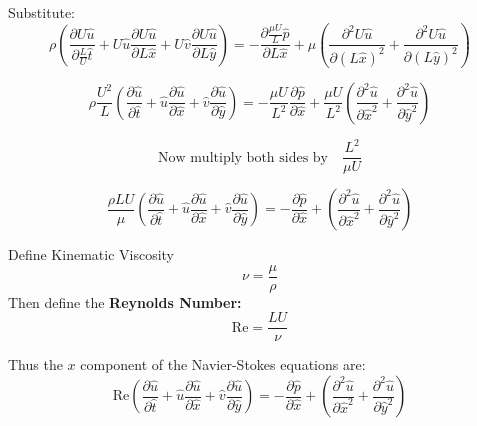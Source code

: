 \documentclass[a4paper]{report}
\begin{document}
Substitute:
\begin{equation}
\rho \left( \frac{\partial U\hat{u}}{\partial \frac{L}{U}\hat{t}} +
U\hat{u} \frac{\partial U\hat{u}}{\partial L\hat{x}} +
U\hat{v} \frac{\partial U\hat{u}}{\partial L\hat{y}} \right) =
 - \frac{\partial \frac{\mu U}{L} \hat{p}}{\partial L\hat{x}} + 
\mu \left( \frac{\partial^2 U\hat{u}}{\partial (L\hat{x})^2} + 
\frac{\partial^2 U\hat{u}}{\partial (L\hat{y})^2} \right)
\end{equation}

\begin{equation}
\rho \frac{U^2}{L} \left( \frac{\partial \hat{u}}{\partial \hat{t}} +
\hat{u} \frac{\partial \hat{u}}{\partial \hat{x}} +
\hat{v} \frac{\partial \hat{u}}{\partial \hat{y}} \right) =
 - \frac{\mu U}{L^2} \frac{\partial \hat{p}}{\partial \hat{x}} + 
\frac{\mu U}{L^2} \left( \frac{\partial^2 \hat{u}}{\partial \hat{x}^2} + 
\frac{\partial^2 \hat{u}}{\partial \hat{y}^2} \right)
\end{equation}

\begin{equation}
\text{Now multiply both sides by} \quad \frac{L^2}{\mu U}
\end{equation}

\begin{equation}
\frac{\rho L U}{\mu} \left( \frac{\partial \hat{u}}{\partial \hat{t}} +
\hat{u} \frac{\partial \hat{u}}{\partial \hat{x}} +
\hat{v} \frac{\partial \hat{u}}{\partial \hat{y}} \right) =
 -  \frac{\partial \hat{p}}{\partial \hat{x}} + 
\left( \frac{\partial^2 \hat{u}}{\partial \hat{x}^2} + 
\frac{\partial^2 \hat{u}}{\partial \hat{y}^2} \right)
\end{equation}


\vspace{1em}
Define Kinematic Viscosity
\begin{equation}
\nu = \frac{\mu}{\rho}
\end{equation}
Then define the \textbf{Reynolds Number:}
\begin{equation}
\mathrm{Re} = \frac{L U}{\nu}
\end{equation}

Thus the $x$ component of the Navier-Stokes equations are:
\begin{equation}
\mathrm{Re} \left( \frac{\partial \hat{u}}{\partial \hat{t}} +
\hat{u} \frac{\partial \hat{u}}{\partial \hat{x}} +
\hat{v} \frac{\partial \hat{u}}{\partial \hat{y}} \right) =
 -  \frac{\partial \hat{p}}{\partial \hat{x}} + 
\left( \frac{\partial^2 \hat{u}}{\partial \hat{x}^2} + 
\frac{\partial^2 \hat{u}}{\partial \hat{y}^2} \right)
\end{equation}
\end{document}
